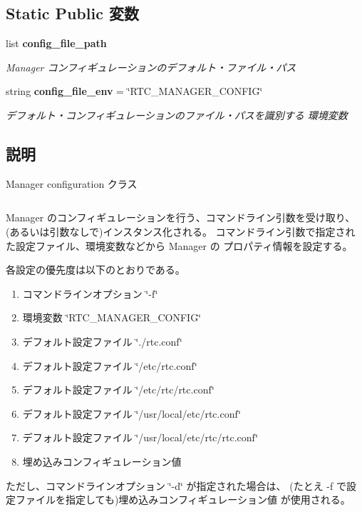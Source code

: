 \subsection*{Static Public 変数}
\begin{CompactItemize}
\item 
list {\bf config\_\-file\_\-path}\label{classsource__py_1_1_manager_config_1_1_manager_config_be91fccad2ba67fe71d0b546b49ca1ff}

\begin{CompactList}\small\item\em Manager コンフィギュレーションのデフォルト・ファイル・パス \item\end{CompactList}\item 
string {\bf config\_\-file\_\-env} = \char`\"{}RTC\_\-MANAGER\_\-CONFIG\char`\"{}\label{classsource__py_1_1_manager_config_1_1_manager_config_7765b5da9b3292ebe517e2d9c403e9c4}

\begin{CompactList}\small\item\em デフォルト・コンフィギュレーションのファイル・パスを識別する 環境変数 \item\end{CompactList}\end{CompactItemize}


\subsection{説明}
Manager configuration クラス 



\footnotesize\begin{verbatim}
\end{verbatim}
\normalsize


Manager のコンフィギュレーションを行う、コマンドライン引数を受け取り、 (あるいは引数なしで)インスタンス化される。 コマンドライン引数で指定された設定ファイル、環境変数などから Manager の プロパティ情報を設定する。

各設定の優先度は以下のとおりである。 \begin{enumerate}
\item コマンドラインオプション \char`\"{}-f\char`\"{} \item 環境変数 \char`\"{}RTC\_\-MANAGER\_\-CONFIG\char`\"{} \item デフォルト設定ファイル \char`\"{}./rtc.conf\char`\"{} \item デフォルト設定ファイル \char`\"{}/etc/rtc.conf\char`\"{} \item デフォルト設定ファイル \char`\"{}/etc/rtc/rtc.conf\char`\"{} \item デフォルト設定ファイル \char`\"{}/usr/local/etc/rtc.conf\char`\"{} \item デフォルト設定ファイル \char`\"{}/usr/local/etc/rtc/rtc.conf\char`\"{} \item 埋め込みコンフィギュレーション値 \end{enumerate}
ただし、コマンドラインオプション \char`\"{}-d\char`\"{} が指定された場合は、 (たとえ -f で設定ファイルを指定しても)埋め込みコンフィギュレーション値 が使用される。

